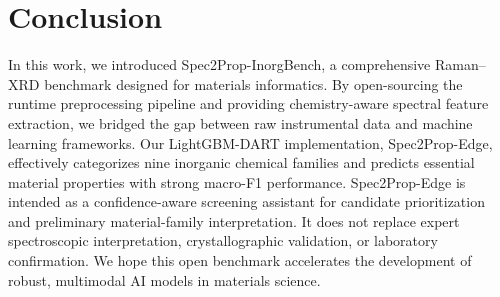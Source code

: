 \section{Conclusion}
\label{sec:conclusion}

In this work, we introduced Spec2Prop-InorgBench, a comprehensive Raman--XRD benchmark designed for materials informatics. By open-sourcing the runtime preprocessing pipeline and providing chemistry-aware spectral feature extraction, we bridged the gap between raw instrumental data and machine learning frameworks. Our LightGBM-DART implementation, Spec2Prop-Edge, effectively categorizes nine inorganic chemical families and predicts essential material properties with strong macro-F1 performance. Spec2Prop-Edge is intended as a confidence-aware screening assistant for candidate prioritization and preliminary material-family interpretation. It does not replace expert spectroscopic interpretation, crystallographic validation, or laboratory confirmation. We hope this open benchmark accelerates the development of robust, multimodal AI models in materials science.
